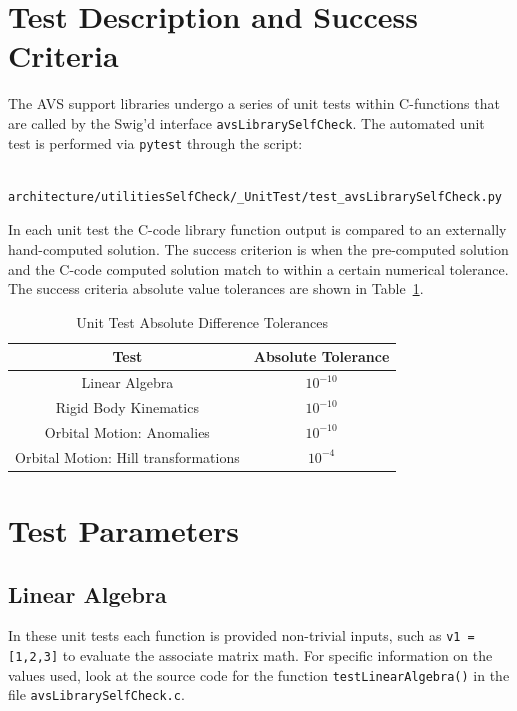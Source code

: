 
\section{Test Description and Success Criteria}
The AVS support libraries undergo a series of unit tests within C-functions that are called by the Swig'd interface {\tt avsLibrarySelfCheck}.  The automated unit test is performed via {\tt pytest} through the script:
\begin{verbatim}
     architecture/utilitiesSelfCheck/_UnitTest/test_avsLibrarySelfCheck.py
\end{verbatim}
In each unit test the C-code library function output is compared to an externally hand-computed solution.  The success criterion is when the pre-computed solution and the C-code computed solution match to within a certain numerical tolerance.  The success criteria absolute value tolerances are shown in Table~\ref{tbl:tolerance}.



\begin{table}[htbp]
	\caption{Unit Test Absolute Difference Tolerances}
	\label{tbl:tolerance}
	\centering \fontsize{10}{10}\selectfont
	\begin{tabular}{c | c} %
		\hline
		\hline
		Test    & Absolute Tolerance \\
		\hline
		  Linear Algebra    & $10^{-10}$ \\
		  Rigid Body Kinematics    & $10^{-10}$ \\
		  Orbital Motion: Anomalies    & $10^{-10}$ \\
		  Orbital Motion: Hill transformations    & $10^{-4}$ \\
		\hline
		\hline
	\end{tabular}
\end{table}





\section{Test Parameters}

\subsection{Linear Algebra}
In these unit tests each function is provided non-trivial inputs, such as {\tt v1 = [1,2,3]} to evaluate the associate matrix math.  For specific information on the values used, look at the source code for the function {\tt testLinearAlgebra()} in the file {\tt avsLibrarySelfCheck.c}.

